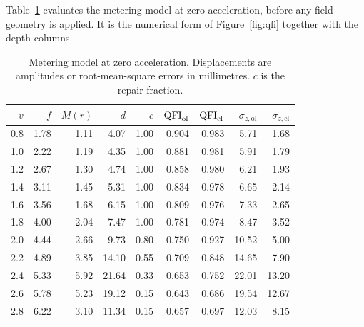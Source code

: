 Table~\ref{tab:speed} evaluates the metering model at zero acceleration, before any field geometry is applied. It is the numerical form of Figure~\ref{fig:qfi} together with the depth columns.

\begin{table}[ht]
\centering
\caption{Metering model at zero acceleration. Displacements are amplitudes or root-mean-square errors in millimetres. \(c\) is the repair fraction.}
\label{tab:speed}
\small
\begin{tabular}{@{}rrrrrrrrr@{}}
\toprule
\(v\) & \(f\) & \(M(r)\) & \(d\) & \(c\) & \(\mathrm{QFI}_{\mathrm{ol}}\) & \(\mathrm{QFI}_{\mathrm{cl}}\) & \(\sigma_{z,\mathrm{ol}}\) & \(\sigma_{z,\mathrm{cl}}\) \\
\midrule
0.8 & 1.78 & 1.11 & 4.07 & 1.00 & 0.904 & 0.983 & 5.71 & 1.68 \\
1.0 & 2.22 & 1.19 & 4.35 & 1.00 & 0.881 & 0.981 & 5.91 & 1.79 \\
1.2 & 2.67 & 1.30 & 4.74 & 1.00 & 0.858 & 0.980 & 6.21 & 1.93 \\
1.4 & 3.11 & 1.45 & 5.31 & 1.00 & 0.834 & 0.978 & 6.65 & 2.14 \\
1.6 & 3.56 & 1.68 & 6.15 & 1.00 & 0.809 & 0.976 & 7.33 & 2.65 \\
1.8 & 4.00 & 2.04 & 7.47 & 1.00 & 0.781 & 0.974 & 8.47 & 3.52 \\
2.0 & 4.44 & 2.66 & 9.73 & 0.80 & 0.750 & 0.927 & 10.52 & 5.00 \\
2.2 & 4.89 & 3.85 & 14.10 & 0.55 & 0.709 & 0.848 & 14.65 & 7.90 \\
2.4 & 5.33 & 5.92 & 21.64 & 0.33 & 0.653 & 0.752 & 22.01 & 13.20 \\
2.6 & 5.78 & 5.23 & 19.12 & 0.15 & 0.643 & 0.686 & 19.54 & 12.67 \\
2.8 & 6.22 & 3.10 & 11.34 & 0.15 & 0.657 & 0.697 & 12.03 & 8.15 \\
\bottomrule
\end{tabular}
\end{table}


